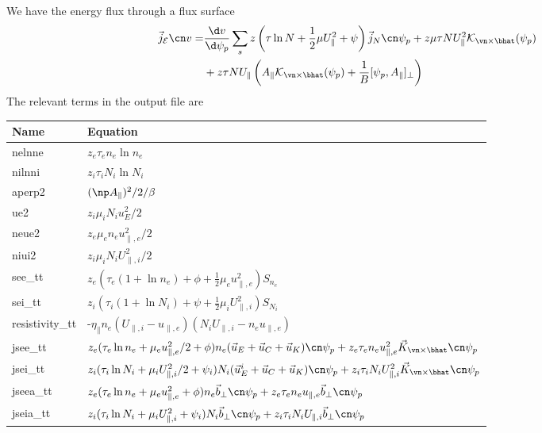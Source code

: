We have the energy flux through a flux surface
\begin{align}
 \vec j_{\mathcal E}\cn v =&%
\frac{\d v}{\d \psi_p}\sum_s z\left (\tau\ln N + \frac{1}{2}\mu U_\parallel^2 + \psi\right) \vec j_N\cn\psi_p
+ z \mu\tau NU_\parallel^2 \mathcal K_{\vn\times\bhat}(\psi_p) \nonumber\\
&+ z \tau NU_\parallel
 \left( A_\parallel \mathcal
 K_{\vn\times\bhat}(\psi_p) + \frac{1}{B}[\psi_p, A_\parallel]_\perp\right)
\label{eq:energy_flux}
\end{align}
The relevant terms in the output file are
\begin{longtable}{ll}
\toprule
\rowcolor{gray!50}\textbf{Name} &  \textbf{Equation}\\
\midrule
    nelnne &$ z_e\tau_e n_e \ln n_e$ \\
    nilnni &$ z_i\tau_i N_i \ln N_i$ \\
    aperp2 &$ (\np A_\parallel)^2/2/\beta$ \\
    ue2   &$z_i\mu_i N_i u_E^2 /2$ \\
    neue2 &$ z_e\mu_e n_e u_{\parallel,e}^2/2$ \\
    niui2 &$ z_i\mu_i N_i U_{\parallel,i}^2/2$ \\
    see\_tt & $z_e(\tau_e (1+\ln n_e) + \phi + \frac{1}{2}\mu_e u_{\parallel,e}^2) S_{n_e} $ \\
    sei\_tt & $z_i(\tau_i (1+\ln N_i) + \psi + \frac{1}{2}\mu_i U_{\parallel,i}^2) S_{N_i} $ \\
    resistivity\_tt &-$\eta_\parallel n_e (U_{\parallel,i}-u_{\parallel,e})(N_iU_{\parallel,i}-n_eu_{\parallel,e})$ \\
    jsee\_tt &$z_e(\tau_e \ln n_e + \mu_e u_{\parallel,e}^2/2 + \phi)n_e(\vec u_E + \vec u_C + \vec u_K)\cn \psi_p
        + z_e \tau_e n_e u_{\parallel,e}^2 \vec K_{\vn\times\bhat}\cn \psi_p$ \\
    jsei\_tt &$z_i(\tau_i \ln N_i + \mu_i U_{\parallel,i}^2/2 + \psi_i)N_i(\vec u_E^i + \vec u_C + \vec u_K)\cn \psi_p
        + z_i \tau_i N_i U_{\parallel,i}^2 \vec K_{\vn\times\bhat}\cn \psi_p$ \\
    jseea\_tt &$z_e(\tau_e \ln n_e + \mu_e u_{\parallel,e}^2 + \phi)n_e \vec { b}_\perp\cn \psi_p
        + z_e \tau_e n_e u_{\parallel,e} \vec{ b}_\perp \cn \psi_p $ \\
    jseia\_tt &$z_i(\tau_i \ln N_i + \mu_i U_{\parallel,i}^2 + \psi_i)N_i \vec { b}_\perp\cn \psi_p
        + z_i \tau_i N_i U_{\parallel,i} \vec{ b}_\perp \cn \psi_p $ \\

\end{longtable}
